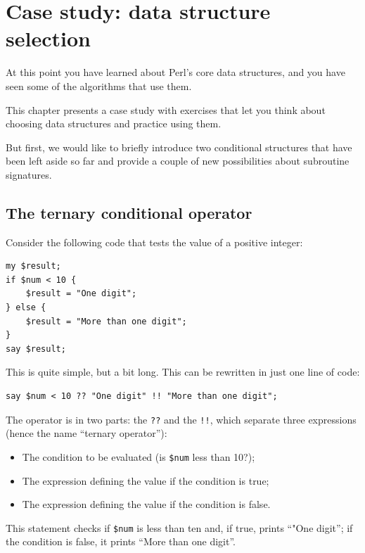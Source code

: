 
\chapter{Case study: data structure selection}
\label{data_struct_sel}

At this point you have learned about Perl's core data structures,
and you have seen some of the algorithms that use them.

This chapter presents a case study with exercises that let
you think about choosing data structures and practice using them.

But first, we would like to briefly introduce two conditional 
structures that have been left aside so far and provide 
a couple of new possibilities about subroutine signatures. 

\section{The ternary conditional operator}
\label{ternary operator}

Consider the following code that tests the value of a positive 
integer:

\begin{verbatim}
my $result;
if $num < 10 {
    $result = "One digit";
} else {
    $result = "More than one digit";
}
say $result;
\end{verbatim}

This is quite simple, but a bit long. This can be rewritten 
in just one line of code:

\begin{verbatim}
say $num < 10 ?? "One digit" !! "More than one digit";
\end{verbatim}

The operator is in two parts: the {\tt ??} and the {\tt !!}, which 
separate three expressions (hence the name ``ternary operator''): 
\begin{itemize}
\item The condition to be evaluated (is \verb'$num' less than 10?);
\item The expression defining the value if the condition is true;
\item The expression defining the value if the condition is false.
\end{itemize}

This statement checks if \verb'$num' is less than ten and, if 
true, prints ``"One digit''; if the 
condition is false, it prints ``More than one digit''.

